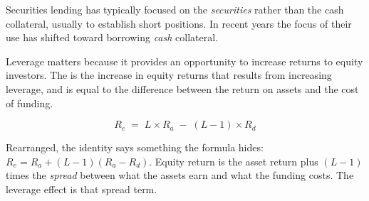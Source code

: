 \begin{lrkeybox}
Securities lending has typically focused on the \emph{securities} rather than the cash collateral, usually to establish short positions. In recent years the focus of their use has shifted toward borrowing \emph{cash} collateral.
\end{lrkeybox}


\begin{lrdefbox}
Leverage matters because it provides an opportunity to increase returns to equity investors. The  is the increase in equity returns that results from increasing leverage, and is equal to the difference between the return on assets and the cost of funding.
\end{lrdefbox}

\begin{lrfmlbox}
\[ R_e \;=\; L \times R_a \;-\; (L-1) \times R_d \]
\end{lrfmlbox}

Rearranged, the identity says something the formula hides: $R_e = R_a + (L-1)(R_a - R_d)$. Equity return is the asset return plus $(L-1)$ times the \emph{spread} between what the assets earn and what the funding costs. The leverage effect is that spread term.

